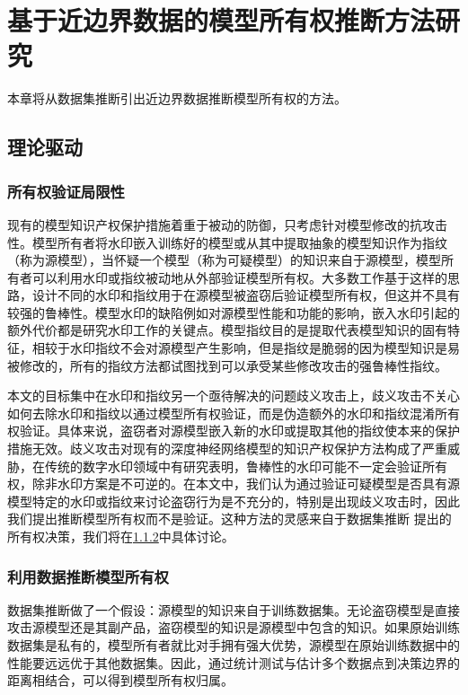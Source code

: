 
\chapter{基于近边界数据的模型所有权推断方法研究}\label{4}

本章将从数据集推断引出近边界数据推断模型所有权的方法。

\section{理论驱动}\label{4.1}

\subsection{所有权验证局限性}

现有的模型知识产权保护措施着重于被动的防御，只考虑针对模型修改的抗攻击性。模型所有者将水印嵌入训练好的模型或从其中提取抽象的模型知识作为指纹（称为源模型），当怀疑一个模型（称为可疑模型）的知识来自于源模型，模型所有者可以利用水印或指纹被动地从外部验证模型所有权。大多数工作基于这样的思路，设计不同的水印和指纹用于在源模型被盗窃后验证模型所有权，但这并不具有较强的鲁棒性。模型水印的缺陷例如对源模型性能和功能的影响，嵌入水印引起的额外代价都是研究水印工作的关键点。模型指纹目的是提取代表模型知识的固有特征，相较于水印指纹不会对源模型产生影响，但是指纹是脆弱的因为模型知识是易被修改的，所有的指纹方法都试图找到可以承受某些修改攻击的强鲁棒性指纹。

本文的目标集中在水印和指纹另一个亟待解决的问题歧义攻击上，歧义攻击不关心如何去除水印和指纹以通过模型所有权验证，而是伪造额外的水印和指纹混淆所有权验证。具体来说，盗窃者对源模型嵌入新的水印或提取其他的指纹使本来的保护措施无效。歧义攻击对现有的深度神经网络模型的知识产权保护方法构成了严重威胁，在传统的数字水印领域中有研究表明，鲁棒性的水印可能不一定会验证所有权，除非水印方案是不可逆的\cite{fan2019rethinking}。在本文中，我们认为通过验证可疑模型是否具有源模型特定的水印或指纹来讨论盗窃行为是不充分的，特别是出现歧义攻击时，因此我们提出推断模型所有权而不是验证。这种方法的灵感来自于数据集推断\cite{maini2021dataset} 提出的所有权决策，我们将在\ref{4.1.2}中具体讨论。

\subsection{利用数据推断模型所有权}\label{4.1.2}

数据集推断做了一个假设：源模型的知识来自于训练数据集。无论盗窃模型是直接攻击源模型还是其副产品，盗窃模型的知识是源模型中包含的知识。如果原始训练数据集是私有的，模型所有者就比对手拥有强大优势，源模型在原始训练数据中的性能要远远优于其他数据集。因此，通过统计测试与估计多个数据点到决策边界的距离相结合，可以得到模型所有权归属。


